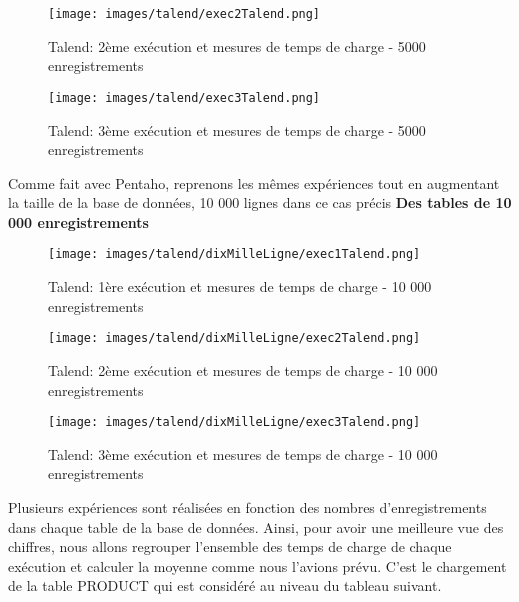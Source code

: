 \documentclass[12pt,a4wide,twoside]{report}
\begin{document}
			\begin{figure}[!h]
	\begin{center}
		\texttt{[image: images/talend/exec2Talend.png]}
	\end{center}
		\caption{Talend: 2ème exécution et mesures de temps de charge - 5000 enregistrements}
	\end{figure} \newpage
			\begin{figure}[!h]
	\begin{center}
		\texttt{[image: images/talend/exec3Talend.png]}
	\end{center}
		\caption{Talend: 3ème exécution et mesures de temps de charge - 5000 enregistrements}
	\end{figure}
	
	Comme fait avec Pentaho, reprenons les mêmes expériences tout en augmentant la taille de la base de données, 10 000 lignes dans ce cas précis\newline
	\textbf{Des tables de 10 000 enregistrements}\newline
			\begin{figure}[!h]
	\begin{center}
		\texttt{[image: images/talend/dixMilleLigne/exec1Talend.png]}
	\end{center}
		\caption{Talend: 1ère exécution et mesures de temps de charge - 10 000 enregistrements}
	\end{figure} \newpage
	
				\begin{figure}[!h]
	\begin{center}
		\texttt{[image: images/talend/dixMilleLigne/exec2Talend.png]}
	\end{center}
		\caption{Talend: 2ème exécution et mesures de temps de charge - 10 000 enregistrements}
	\end{figure}
	
\begin{figure}[!h]
	\begin{center}
		\texttt{[image: images/talend/dixMilleLigne/exec3Talend.png]}
	\end{center}
		\caption{Talend: 3ème exécution et mesures de temps de charge - 10 000 enregistrements}
\end{figure}
Plusieurs expériences sont réalisées en fonction des nombres d'enregistrements dans chaque table de la base de données. Ainsi, pour avoir une meilleure vue des chiffres, nous allons regrouper l'ensemble des temps de charge de chaque exécution et calculer la moyenne comme nous l'avions prévu. C'est le chargement de la table PRODUCT qui est considéré au niveau du tableau suivant.\newpage
\end{document}
